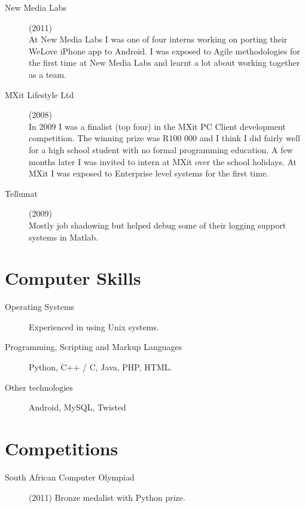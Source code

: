 \documentclass[margin,line,a4paper]{resume}
\begin{document}
\begin{resume}
\begin{description}
                \item[New Media Labs] (2011) \\
                    At New Media Labs I was one of four interns working on porting their WeLove iPhone app to Android.
                    I was exposed to Agile methodologies for the first time at New Media Labs and learnt a lot about
                    working together as a team.

                \item[MXit Lifestyle Ltd] (2008) \\
                    In 2009 I was a finalist (top four) in the MXit PC Client development competition. The winning prize was R100 000 and I think I did fairly well for a high school student with no formal programming education. A few months later I was invited to intern at MXit over the school holidays. At MXit I was exposed to Enterprise level systems for the first time.

                \item[Tellumat] (2009) \\
                    Mostly job shadowing but helped debug some of their logging support systems
                in Matlab.

            \end{description}

        \section{\mysidestyle Computer Skills}
            \begin{description}
                \item [Operating Systems] Experienced in using Unix systems.

                \item [Programming, Scripting and Markup Languages] Python, C++ / C, Java, PHP, HTML.

                \item [Other technologies] Android, MySQL, Twisted
            \end{description}

        \section{\mysidestyle Competitions}
            \begin{description}
                \item [South African Computer Olympiad] (2011) Bronze medalist with Python prize.


\end{description}
\end{resume}
\end{document}
